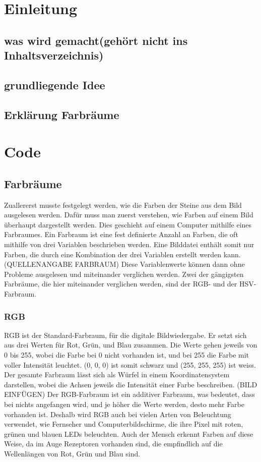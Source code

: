 \documentclass[a4paper, 12pt]{article}
\begin{document}
\tableofcontents
\section{Einleitung}
\subsection{was wird gemacht(gehört nicht ins Inhaltsverzeichnis)}
\subsection{grundliegende Idee}
\subsection{Erklärung Farbräume}
\section{Code}
\subsection{Farbräume}
Zuallererst musste festgelegt werden, wie die Farben der Steine aus dem Bild ausgelesen werden. Dafür muss man zuerst verstehen, wie Farben auf einem Bild überhaupt dargestellt werden. Dies geschieht auf einem Computer mithilfe eines Farbraumes. Ein Farbraum ist eine fest definierte Anzahl an Farben, die oft mithilfe von drei Variablen beschrieben werden. Eine Bilddatei enthält somit nur Farben, die durch eine Kombination der drei Variablen erstellt werden kann.(QUELLENANGABE FARBRAUM) Diese Variablenwerte können dann ohne Probleme ausgelesen und miteinander verglichen werden. Zwei der gängigsten Farbräume, die hier miteinander verglichen werden, sind der RGB- und der HSV-Farbraum. 
\subsubsection{RGB}
RGB ist der Standard-Farbraum, für die digitale Bildwiedergabe. Er setzt sich aus drei Werten für Rot, Grün, und Blau zusammen. Die Werte gehen jeweils von 0 bis 255, wobei die Farbe bei 0 nicht vorhanden ist, und bei 255 die Farbe mit voller Intensität leuchtet. (0, 0, 0) ist somit schwarz und (255, 255, 255) ist weiss. Der gesamte Farbraum lässt sich als Würfel in einem Koordinatensystem darstellen, wobei die Achsen jeweils die Intensität einer Farbe beschreiben. (BILD EINFÜGEN) Der RGB-Farbraum ist ein additiver Farbraum, was bedeutet, dass bei nichts angefangen wird, und je höher die Werte werden, desto mehr Farbe vorhanden ist. Deshalb wird RGB auch bei vielen Arten von Beleuchtung verwendet, wie Fernseher und Computerbildschirme, die ihre Pixel mit roten, grünen und blauen LEDs beleuchten. Auch der Mensch erkennt Farben auf diese Weise, da im Auge Rezeptoren vorhanden sind, die empfindlich auf die Wellenlängen von Rot, Grün und Blau sind.
\end{document}
